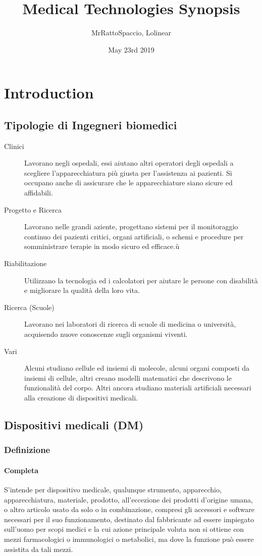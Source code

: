 \documentclass[a4paper]{article}
\title{\Huge Medical Technologies Synopsis \vspace{1cm}}
\author{MrRattoSpaccio, Lolinear}
\date{May 23rd 2019}
\begin{document}
\maketitle
\thispagestyle{empty}
\pagebreak
\tableofcontents

\section{Introduction}
\subsection{Tipologie di Ingegneri biomedici}
\begin{description}
    \item[Clinici] Lavorano negli ospedali, essi aiutano altri operatori degli
    ospedali a scegliere l'apparecchiatura più giusta per l'assistenza ai 
    pazienti. Si occupano anche di assicurare che le apparecchiature siano
    sicure ed affidabili.
    \item[Progetto e Ricerca] Lavorano nelle grandi aziente, progettano sistemi
    per il monitoraggio continuo dei pazienti critici, organi artificiali, o 
    schemi e procedure per somministrare terapie in modo sicuro ed efficace.ù
    \item[Riabilitazione] Utilizzano la tecnologia ed i calcolatori per 
    aiutare le persone con disabilità e migliorare la qualità della loro vita.
    \item[Ricerca (Scuole)] Lavorano nei laboratori di ricerca di scuole di 
    medicina o università, acquisendo nuove conoscenze sugli organismi viventi.
    \item[Vari] Alcuni studiano cellule ed insiemi di molecole, alcuni organi
    composti da insiemi di cellule, altri creano modelli matematici che 
    descrivono le funzionalità del corpo. Altri ancora studiano materiali
    artificiali necessari alla creazione di dispositivi medicali. 
\end{description}
\subsection{Dispositivi medicali (DM)}
\subsubsection{Definizione}
\paragraph{Completa}
S’intende per dispositivo medicale, qualunque strumento, apparecchio, 
apparecchiatura, materiale, prodotto, all’eccezione dei prodotti d’origine 
umana, o altro articolo usato da solo o in combinazione, compresi gli accessori
e software necessari per il suo funzionamento, destinato dal fabbricante ad 
essere impiegato sull'uomo per scopi medici e la cui azione principale voluta 
non si ottiene con mezzi farmacologici o immunologici o metabolici, ma dove 
la funzione può essere assistita da tali mezzi.
\end{document}
